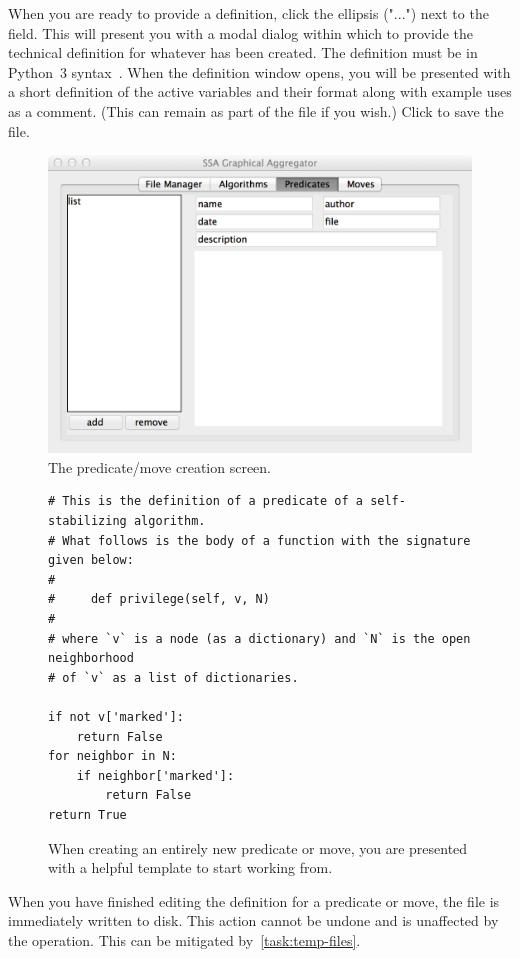 When you are ready to provide a definition,
  click the ellipsis ("...") next to the  field.
This will present you with a modal dialog within which to provide
  the technical definition for whatever has been created.
The definition must be in Python~3 syntax~\autocite{python3:ref}.
When the definition window opens, you will be presented with
  a short definition of the active variables and their format \Dash
  along with example uses \Dash
  as a comment.
(This can remain as part of the file if you wish.)
Click  to save the file.
\begin{figure}
  \centering
  \includegraphics[width=\textwidth]{predicate-move}
  \caption{The predicate\slash move creation screen.}
  \label{fig:iface:pred-screen}
\end{figure}
\begin{figure}
  \centering
\begin{lstlisting}
# This is the definition of a predicate of a self-stabilizing algorithm.
# What follows is the body of a function with the signature given below:
#
#     def privilege(self, v, N)
#
# where `v` is a node (as a dictionary) and `N` is the open neighborhood
# of `v` as a list of dictionaries.

if not v['marked']:
    return False
for neighbor in N:
    if neighbor['marked']:
        return False
return True
\end{lstlisting}
  \caption{When creating an entirely new predicate or move,
    you are presented with a helpful template to start working from.}
  \label{fig:iface:create-pred}
\end{figure}
\begin{warning}
  When you have finished editing the definition for a predicate or move,
    the file is immediately written to disk.
  This action cannot be undone and is unaffected by the  operation.
  This can be mitigated by~\autoref{task:temp-files}.
\end{warning}

